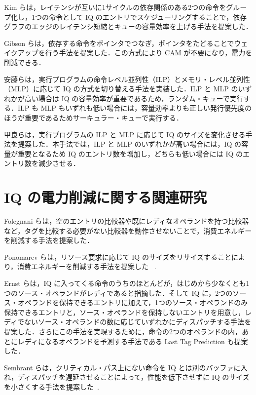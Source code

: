 Kim らは，レイテンシが互いに1サイクルの依存関係のある2つの命令をグループ化し，1つの命令として IQ のエントリでスケジューリングすることで，依存グラフのエッジのレイテンシ短縮とキューの容量効率を上げる手法を提案した\cite{Kim2003}．

Gibson らは，依存する命令をポインタでつなぎ，ポインタをたどることでウェイクアップを行う手法を提案した\cite{Gibson2010}．この方式により CAM が不要になり，電力を削減できる．

安藤らは，実行プログラムの命令レベル並列性（ILP）とメモリ・レベル並列性（MLP）に応じて IQ の方式を切り替える手法を実装した\cite{Ando2019}．ILP と MLP のいずれかが高い場合は IQ の容量効率が重要であるため，ランダム・キューで実行する．ILP も MLP もいずれも低い場合には，容量効率よりも正しい発行優先度のほうが重要であるためサーキュラー・キューで実行する．

甲良らは，実行プログラムの ILP と MLP に応じて IQ のサイズを変化させる手法を提案した\cite{Kora2013}．本手法では，ILP と MLP のいずれかが高い場合には，IQ の容量が重要となるため IQ のエントリ数を増加し，どちらも低い場合には IQ のエントリ数を減少させる．

\section{IQ の電力削減に関する関連研究}
\label{sec:relate_energy}
Folegnani らは，空のエントリの比較器や既にレディなオペランドを持つ比較器など，タグを比較する必要がない比較器を動作させないことで，消費エネルギーを削減する手法を提案した\cite{folegnani2001}．

Ponomarev らは，リソース要求に応じて IQ のサイズをリサイズすることにより，消費エネルギーを削減する手法を提案した~\cite{ponomarev2001} .

Ernst らは，IQ に入ってくる命令のうちのほとんどが，はじめから少なくとも1つのソース・オペランドがレディであると指摘した\cite{ernst2002}．そして IQ に，2つのソース・オペランドを保持できるエントリに加えて，1つのソース・オペランドのみ保持できるエントリと，ソース・オペランドを保持しないエントリを用意し，レディでないソース・オペランドの数に応じていずれかにディスパッチする手法を提案した．さらにこの手法を実現するために，命令の2つのオペランドの内，あとにレディになるオペランドを予測する手法である Last Tag Prediction も提案した．

Sembrant らは，クリティカル・パス上にない命令を IQ とは別のバッファに入れ，ディスパッチを遅延させることによって，性能を低下させずに IQ のサイズを小さくする手法を提案した~\cite{Sembrant2015}.

